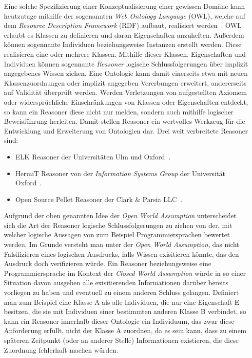Eine solche \glqq{}Spezifizierung einer Konzeptualisierung\grqq{} einer gewissen Domäne kann heutzutage mithilfe der sogenannten \textit{Web Ontology Language} (OWL), welche auf dem \textit{Resource Description Framework} (RDF) aufbaut, realisiert werden~\cite{OWL_W3C}\cite{RDF_W3C}.
OWL erlaubt es Klassen zu definieren und daran Eigenschaften anzuheften.
Außerdem können sogennante Individuen beziehungsweise Instanzen erstellt werden.
Diese realisieren eine oder mehrere Klassen.
Mithilfe dieser Klassen, Eigenschaften und Individuen können sogennante \textit{Reasoner} logische Schlussfolgerungen über implizit angegebenes Wissen ziehen.
Eine Ontologie kann damit einerseits etwa mit neuen Klassenzuordnungen oder implizit angegeben Vererbungen erweitert, andererseits auf Validität überprüft werden.
Werden Verletzungen von aufgestellten Axiomem oder widersprüchliche Einschränkungen von Klassen oder Eigenschaften entdeckt, so kann ein Reasoner diese nicht nur melden, sondern auch mithilfe logischer Beweisführung herleiten.
Damit stellen Reasoner ein wertvolles Werkzeug für die Entwicklung und Erweiterung von Ontologien dar.
Drei weit verbreitete Reasoner sind: 
\begin{itemize}
  \item ELK Reasoner der Universitäten Ulm und Oxford~\cite{Kazakov2014}.
  \item HermiT Reasoner von der \textit{Information Systems Group} der Universität Oxford~\cite{Glimm2014}\cite{HermitReasoner:online}.
  \item Open Source Pellet Reasoner der Clark \& Parsia LLC~\cite{Sirin2007}. 
\end{itemize}
Aufgrund der oben genannten Idee der \textit{Open World Assumption} unterscheidet sich die Art der Reasoner logische Schlussfolgerungen zu ziehen von der, mit welcher logische Aussagen von zum Beispiel Programmiersprachen bewertet werden.
Im Grunde versteht man unter der \textit{Open World Assumption}, das nicht Falsifizieren eines logischen Ausdrucks, falls Wissen exisitieren könnte, das den Ausdruck doch verifizieren würde.
Ein Reasoner beziehungsweise eine Programmiersprache im Kontext der \textit{Closed World Assumption} würde in so einer Situation davon ausgehen alle exisitierenden Informationen darüber bereits vorliegen zu haben und eventuell zu einem anderen Schluss gelangen.
Definiert man zum Beispiel eine Klasse A als alle Individuen, die nur eine Eigenschaft E besitzen, die sie mit Individuen einer bestimmten anderen Klasse B verbindet, so kann ein Reasoner innerhalb dieser Ontologie ein Individuum, das zwar diese Anforderung erfüllt, nicht der Klasse A zuordnen, da es sein kann, dass zu einem späteren Zeitpunkt (oder an anderer Stelle) Informationen existieren, die diese Zuordnung fehlerhaft machen würden.
